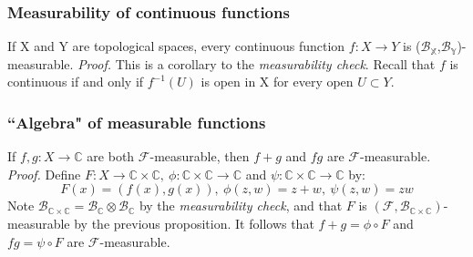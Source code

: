 \documentclass{article}
\begin{document}
\subsubsection{Measurability of continuous functions}
If X and Y are topological spaces, every continuous function $f:X\to Y$ is ($\mathcal{B}_{\mathbb{X}}$,$\mathcal{B}_{\mathbb{Y}}$)-measurable.\newline \newline
\textit{Proof.}\newline \newline
This is a corollary to the \emph{measurability check}. Recall that $f$ is continuous if and only if $f^{-1}(U)$ is open in X for every open $U \subset Y$.
\subsubsection{``Algebra" of measurable functions}
If $f,g:X\to\mathbb{C}$ are both $\mathcal{F}$-measurable, then $f+g$ and $fg$ are $\mathcal{F}$-measurable. \newline \newline
\textit{Proof.}\newline \newline
Define $F:X\to \mathbb{C}\times\mathbb{C}, \ \phi:\mathbb{C}\times\mathbb{C}\to\mathbb{C}$ and $\psi:\mathbb{C}\times\mathbb{C}\to\mathbb{C}$ by:
\[
F(x)=(f(x),g(x)), \ \phi(z,w) = z+w, \ \psi(z,w) = zw
\]
Note $\mathcal{B}_{\mathbb{C}\times\mathbb{C}}=\mathcal{B}_{\mathbb{C}}\otimes\mathcal{B}_{\mathbb{C}}$ by the \emph{measurability check}, and that $F$ is $(\mathcal{F},\mathcal{B}_{\mathbb{C}\times\mathbb{C}})$-measurable by the previous proposition. It follows that $f+g=\phi\circ F$ and $fg=\psi\circ F$ are $\mathcal{F}$-measurable.
\end{document}
